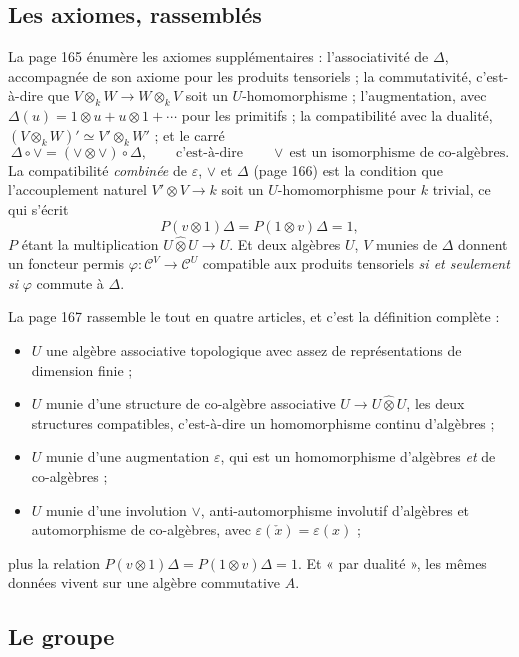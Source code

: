 \documentclass[11pt,a4paper]{article}
\begin{document}
\subsection*{Les axiomes, rassemblés}

La page 165 énumère les axiomes supplémentaires : l'associativité de $\Delta$,
accompagnée de son axiome pour les produits tensoriels ; la commutativité,
c'est-à-dire que $V \otimes_{k}W \to W \otimes_{k}V$ soit un
$U$-homomorphisme ; l'augmentation, avec $\Delta(u) = 1 \otimes u + u \otimes
1 + \cdots$ pour les primitifs ; la compatibilité avec la dualité,
$(V \otimes_{k}W)' \simeq V' \otimes_{k} W'$ ; et le carré
\[
\Delta \circ \vee = (\vee \otimes \vee) \circ \Delta ,
\qquad\text{c'est-à-dire}\qquad
\vee \ \text{est un isomorphisme de co-algèbres.}
\]
La compatibilité \emph{combinée} de $\varepsilon$, $\vee$ et $\Delta$ (page
166) est la condition que l'accouplement naturel $V' \otimes V \to k$ soit un
$U$-homomorphisme pour $k$ trivial, ce qui s'écrit
\[
P(v \otimes 1)\Delta = P(1 \otimes v)\Delta = 1 ,
\]
$P$ étant la multiplication $U \mathbin{\widehat{\otimes}} U \to U$. Et deux
algèbres $U$, $V$ munies de $\Delta$ donnent un foncteur permis $\varphi
\colon \mathcal{C}^{V} \to \mathcal{C}^{U}$ compatible aux produits tensoriels
\emph{si et seulement si} $\varphi$ commute à $\Delta$.

La page 167 rassemble le tout en quatre articles, et c'est la définition
complète :
\begin{itemize}
\item $U$ une algèbre associative topologique avec assez de représentations de
dimension finie ;
\item $U$ munie d'une structure de co-algèbre associative $U \to U
\mathbin{\widehat{\otimes}} U$, les deux structures compatibles, c'est-à-dire
un homomorphisme continu d'algèbres ;
\item $U$ munie d'une augmentation $\varepsilon$, qui est un homomorphisme
d'algèbres \emph{et} de co-algèbres ;
\item $U$ munie d'une involution $\vee$, anti-automorphisme involutif
d'algèbres et automorphisme de co-algèbres, avec $\varepsilon(\check{x}) =
\varepsilon(x)$ ;
\end{itemize}
plus la relation $P(v \otimes 1)\Delta = P(1 \otimes v)\Delta = 1$. Et « par
dualité », les mêmes données vivent sur une algèbre commutative $A$.

\subsection*{Le groupe}
\end{document}
